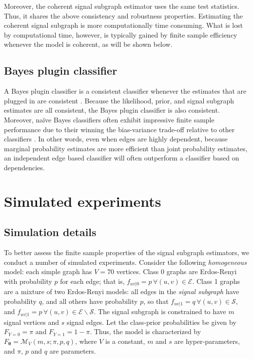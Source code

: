 \documentclass[10pt,journal,cspaper,compsoc]{IEEEtran}
\providecommand{\ve}[1]{\boldsymbol{#1}}
\newcommand{\bth}{\ve{\theta}}
\providecommand{\mc}[1]{\mathcal{#1}}
\begin{document}
Moreover, the coherent signal subgraph estimator uses the same test statistics.  Thus, it shares the above consistency and robustness properties.  Estimating the coherent signal subgraph is more computationally time consuming. What is lost by computational time, however, is typically gained by finite sample efficiency whenever the model is coherent, as will be shown below.


\subsection{Bayes plugin classifier}

A Bayes plugin classifier is a consistent classifier whenever the estimates that are plugged in are consistent \cite{Bickel2000}.  Because the likelihood, prior, and signal subgraph estimates are all consistent, the Bayes plugin classifier is also consistent.  Moreover, na\"ive Bayes classifiers often exhibit impressive finite sample performance due to their winning the bias-variance trade-off relative to other classifiers \cite{Hand2001}.  In other words, even when edges are highly dependent, because marginal probability estimates are more efficient than joint probability estimates, an independent edge based classifier will often outperform a classifier based on dependencies.






\section{Simulated experiments} %
\label{sub:subsection_name}

\subsection{Simulation details} %
\label{sub:simulation_details}

To better assess the finite sample properties of the signal subgraph estimators, we conduct a number of simulated experiments.  Consider the following \emph{homogeneous} model: each simple graph has $V=70$ vertices.  Class 0 graphs are Erdos-Renyi with probability $p$ for each edge; that is, $f_{uv|0}=p \, \forall (u,v) \in \mc{E}$.  Class 1 graphs are a mixture of two Erdos-Renyi models: all edges in the \emph{signal subgraph} have probability $q$, and all others have probability $p$, so that $f_{uv|1}=q \, \forall (u,v) \in \mc{S}$, and $f_{uv|1}=p \, \forall (u,v) \in \mc{E} \backslash \mc{S}$.  The signal subgraph is constrained to have $m$ signal vertices and $s$ signal edges.  Let the class-prior probabilities be given by $F_{Y=0}=\pi$ and $F_{Y=1}=1-\pi$. Thus, the model is characterized by $F_{\bth}=\mc{M}_V(m,s; \pi,p,q)$, where $V$ is a constant, $m$ and $s$ are hyper-parameters, and $\pi$, $p$ and $q$ are parameters.  
\end{document}
